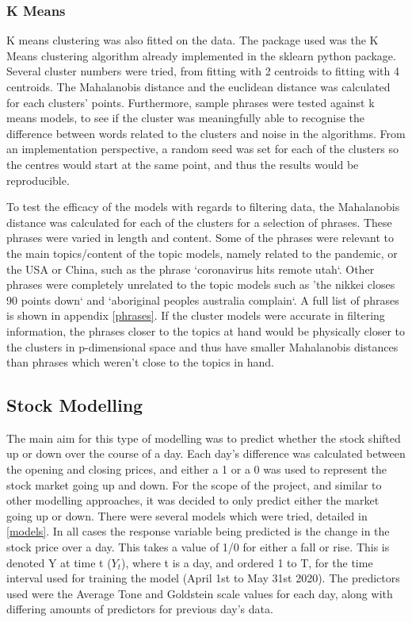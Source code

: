 \subsubsection{K Means}
K means clustering was also fitted on the data. The package used was the K Means clustering algorithm already implemented in the sklearn python package. Several cluster numbers were tried, from fitting with 2 centroids to fitting with 4 centroids. The Mahalanobis distance and the euclidean distance was calculated for each clusters' points. Furthermore, sample phrases were tested against k means models, to see if the cluster was meaningfully able to recognise the difference between words related to the clusters and noise in the algorithms. From an implementation perspective, a random seed was set for each of the clusters so the centres would start at the same point, and thus the results would be reproducible. 

To test the efficacy of the models with regards to filtering data, the Mahalanobis distance was calculated for each of the clusters for a selection of phrases. These phrases were varied in length and content. Some of the phrases were relevant to the main topics/content of the topic models,  namely related to the pandemic, or the USA or China, such as the phrase `coronavirus hits remote utah`. Other phrases were completely unrelated to the topic models such as 'the nikkei closes 90 points down` and `aboriginal peoples australia complain`. A full list of phrases is shown in appendix \ref{phrases}. If the cluster models were accurate in filtering information, the phrases closer to the topics at hand would be physically closer to the clusters in p-dimensional space and thus have smaller Mahalanobis distances than phrases which weren't close to the topics in hand.  

\subsection{Stock Modelling}
The main aim for this type of modelling was to predict whether the stock shifted up or down over the course of a day. Each day's difference was calculated between the opening and closing prices, and either a 1 or a 0 was used to represent the stock market going up and down. For the scope of the project, and similar to other modelling approaches, it was decided to only predict either the market going up or down. There were several models which were tried, detailed in \ref{models}. In all cases the response variable being predicted is the change in the stock price over a day. This takes a value of 1/0 for either a fall or rise. This is denoted Y at time t ($Y_{t}$), where t is a day, and ordered 1 to T, for the time interval used for training the model (April 1st to May 31st 2020). The predictors used were the Average Tone and Goldstein scale values for each day, along with differing amounts of predictors for previous day's data.

